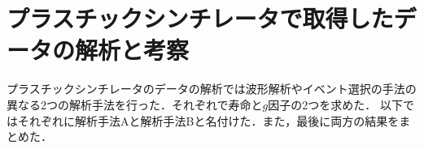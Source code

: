 







%


 \section{プラスチックシンチレータで取得したデータの解析と考察}
 プラスチックシンチレータのデータの解析では波形解析やイベント選択の手法の異なる2つの解析手法を行った．それぞれで寿命と$g$因子の2つを求めた．
 以下ではそれぞれに解析手法Aと解析手法Bと名付けた．また，最後に両方の結果をまとめた．
 
